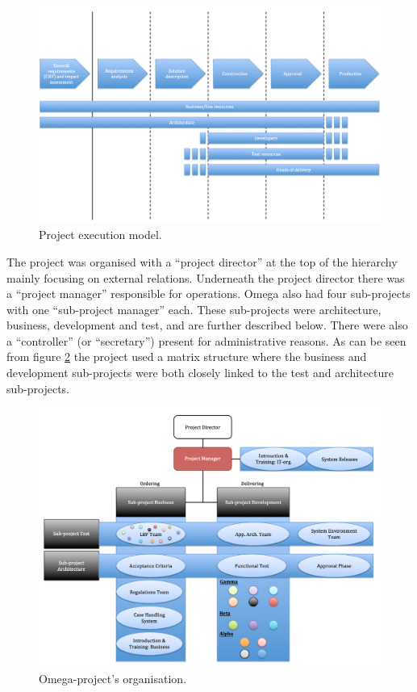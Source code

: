 \begin{figure}
\centering
\includegraphics[trim = 0mm 0mm 0mm 0mm,width=\textwidth]{images/execution_model.png}
\caption{Project execution model.}
\label{project_execution}
\end{figure}

The project was organised with a ``project director'' at the top of the hierarchy mainly focusing on external relations. Underneath the project director there was a ``project manager'' responsible for operations. Omega also had four sub-projects with one ``sub-project manager'' each. These sub-projects were architecture, business, development and test, and are further described below. There were also a ``controller'' (or ``secretary'') present for administrative reasons. As can be seen from figure \ref{omega} the project used a matrix structure where the business and development sub-projects were both closely linked to the test and architecture sub-projects.

\begin{figure}
\centering
\includegraphics[trim = 0mm 0mm 0mm 0mm,width=\textwidth]{images/omega_organisation.png}
\caption{Omega-project's organisation.}
\label{omega}
\end{figure}

